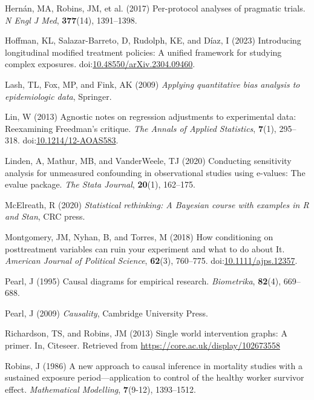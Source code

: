 \documentclass[
  single column]{article}
\newlength{\cslhangindent}
\newenvironment{CSLReferences}[2] %
 {\begin{list}{}{%
  \setlength{\itemindent}{0pt}
  \setlength{\leftmargin}{0pt}
  \setlength{\parsep}{0pt}
  \ifodd #1
   \setlength{\leftmargin}{\cslhangindent}
   \setlength{\itemindent}{-1\cslhangindent}
  \fi
  \setlength{\itemsep}{#2\baselineskip}}}
 {\end{list}}
\begin{document}
\begin{CSLReferences}{1}{0}
Hernán, MA, Robins, JM, et al. (2017) Per-protocol analyses of pragmatic
trials. \emph{N Engl J Med}, \textbf{377}(14), 1391--1398.

Hoffman, KL, Salazar-Barreto, D, Rudolph, KE, and Díaz, I (2023)
Introducing longitudinal modified treatment policies: A unified
framework for studying complex exposures.
doi:\href{https://doi.org/10.48550/arXiv.2304.09460}{10.48550/arXiv.2304.09460}.

Lash, TL, Fox, MP, and Fink, AK (2009) \emph{Applying quantitative bias
analysis to epidemiologic data}, Springer.

Lin, W (2013) {Agnostic notes on regression adjustments to experimental
data: Reexamining Freedman's critique}. \emph{The Annals of Applied
Statistics}, \textbf{7}(1), 295--318.
doi:\href{https://doi.org/10.1214/12-AOAS583}{10.1214/12-AOAS583}.

Linden, A, Mathur, MB, and VanderWeele, TJ (2020) Conducting sensitivity
analysis for unmeasured confounding in observational studies using
e-values: The evalue package. \emph{The Stata Journal}, \textbf{20}(1),
162--175.

McElreath, R (2020) \emph{Statistical rethinking: A {B}ayesian course
with examples in {R} and {S}tan}, CRC press.

Montgomery, JM, Nyhan, B, and Torres, M (2018) How conditioning on
posttreatment variables can ruin your experiment and what to do about
It. \emph{American Journal of Political Science}, \textbf{62}(3),
760--775.
doi:\href{https://doi.org/10.1111/ajps.12357}{10.1111/ajps.12357}.

Pearl, J (1995) Causal diagrams for empirical research.
\emph{Biometrika}, \textbf{82}(4), 669--688.

Pearl, J (2009) \emph{Causality}, Cambridge University Press.

Richardson, TS, and Robins, JM (2013) Single world intervention graphs:
A primer. In, Citeseer. Retrieved from
\url{https://core.ac.uk/display/102673558}

Robins, J (1986) A new approach to causal inference in mortality studies
with a sustained exposure period---application to control of the healthy
worker survivor effect. \emph{Mathematical Modelling}, \textbf{7}(9-12),
1393--1512.


\end{CSLReferences}
\end{document}
